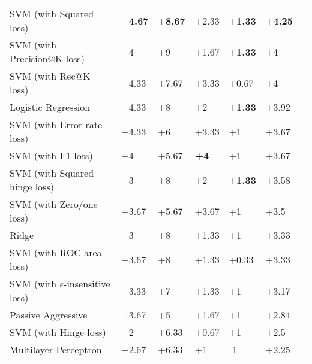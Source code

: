 \begin{table}[h!]
{\begin{tabular}{@{}lllllll@{}}
SVM (with Squared loss)                               & +\textbf{4.67}  & +\textbf{8.67}     & +2.33           & +\textbf{1.33}     & +\textbf{4.25} \\
SVM (with Precision@K loss)                            & +4              & +9                 & +1.67           & +\textbf{1.33}     & +4             \\
SVM (with Rec@K loss)                                 & +4.33           & +7.67              & +3.33           & +0.67              & +4             \\
Logistic Regression                                    & +4.33           & +8                 & +2              & +\textbf{1.33}     & +3.92          \\
SVM (with Error-rate loss)                             & +4.33           & +6                 & +3.33           & +1                 & +3.67          \\
SVM (with F1 loss)                                     & +4              & +5.67              & \textbf{+4}     & +1                 & +3.67          \\
SVM (with Squared hinge loss)                           & +3              & +8                 & +2              & +\textbf{1.33}     & +3.58          \\
SVM (with Zero/one loss)                               & +3.67           & +5.67              & +3.67		  & +1                 & +3.5           \\
Ridge                                                   & +3              & +8                 & +1.33           & +1                 & +3.33          \\
SVM (with ROC area loss)                                & +3.67           & +8                 & +1.33           & +0.33              & +3.33          \\
SVM (with $\epsilon$-insensitive loss)                   & +3.33           & +7                 & +1.33           & +1                 & +3.17          \\
Passive Aggressive                                       & +3.67           & +5                 & +1.67           & +1                 & +2.84          \\
SVM (with Hinge loss)                                    & +2              & +6.33              & +0.67           & +1                 & +2.5           \\
Multilayer Perceptron                                 & +2.67           & +6.33              & +1              & -1                & +2.25          \\

\end{tabular}}
\end{table}
